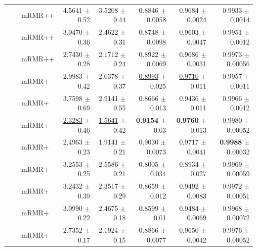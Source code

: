 \begin{longtable}{llp{}rrrrr}
 &  & mRMR++ & 4.5641 {\scriptsize $\pm$ 0.52} & 3.5208 {\scriptsize $\pm$ 0.44} & 0.8846 {\scriptsize $\pm$ 0.0058} & 0.9684 {\scriptsize $\pm$ 0.0024} & 0.9933 {\scriptsize $\pm$ 0.0014} \\
 &  & mRMR++ & 3.0470 {\scriptsize $\pm$ 0.36} & 2.4622 {\scriptsize $\pm$ 0.31} & 0.8748 {\scriptsize $\pm$ 0.0098} & 0.9603 {\scriptsize $\pm$ 0.0047} & 0.9951 {\scriptsize $\pm$ 0.0012} \\
 &  & mRMR++ & 2.7430 {\scriptsize $\pm$ 0.28} & 2.1712 {\scriptsize $\pm$ 0.24} & 0.8922 {\scriptsize $\pm$ 0.0069} & 0.9686 {\scriptsize $\pm$ 0.0031} & 0.9973 {\scriptsize $\pm$ 0.00056} \\
 &  & mRMR+ & 2.9983 {\scriptsize $\pm$ 0.42} & 2.0378 {\scriptsize $\pm$ 0.37} & \underline{0.8993} {\scriptsize $\pm$ 0.025} & \underline{0.9710} {\scriptsize $\pm$ 0.011} & 0.9957 {\scriptsize $\pm$ 0.0011} \\
 &  & mRMR+ & 3.7598 {\scriptsize $\pm$ 0.69} & 2.9141 {\scriptsize $\pm$ 0.55} & 0.8666 {\scriptsize $\pm$ 0.013} & 0.9436 {\scriptsize $\pm$ 0.011} & 0.9966 {\scriptsize $\pm$ 0.0012} \\
 &  & mRMR+ & \underline{2.3283} {\scriptsize $\pm$ 0.46} & \underline{1.5641} {\scriptsize $\pm$ 0.42} & \textbf{0.9154} {\scriptsize $\pm$ 0.03} & \textbf{0.9760} {\scriptsize $\pm$ 0.013} & 0.9980 {\scriptsize $\pm$ 0.00052} \\
 &  & mRMR+ & 2.4963 {\scriptsize $\pm$ 0.23} & 1.9141 {\scriptsize $\pm$ 0.21} & 0.9030 {\scriptsize $\pm$ 0.0073} & 0.9717 {\scriptsize $\pm$ 0.0041} & \textbf{0.9988} {\scriptsize $\pm$ 0.00032} \\
 &  & mRMR+ & 3.2553 {\scriptsize $\pm$ 0.25} & 2.5586 {\scriptsize $\pm$ 0.21} & 0.8005 {\scriptsize $\pm$ 0.034} & 0.8934 {\scriptsize $\pm$ 0.027} & 0.9969 {\scriptsize $\pm$ 0.00059} \\
 &  & mRMR+ & 3.2432 {\scriptsize $\pm$ 0.39} & 2.3517 {\scriptsize $\pm$ 0.29} & 0.8659 {\scriptsize $\pm$ 0.012} & 0.9492 {\scriptsize $\pm$ 0.0083} & 0.9972 {\scriptsize $\pm$ 0.00051} \\
 &  & mRMR+ & 3.0990 {\scriptsize $\pm$ 0.22} & 2.4675 {\scriptsize $\pm$ 0.18} & 0.8599 {\scriptsize $\pm$ 0.01} & 0.9484 {\scriptsize $\pm$ 0.0069} & 0.9968 {\scriptsize $\pm$ 0.00072} \\
 &  & mRMR+ & 2.7352 {\scriptsize $\pm$ 0.17} & 2.1924 {\scriptsize $\pm$ 0.15} & 0.8866 {\scriptsize $\pm$ 0.0077} & 0.9650 {\scriptsize $\pm$ 0.0042} & 0.9976 {\scriptsize $\pm$ 0.00052} \\

\end{longtable}
